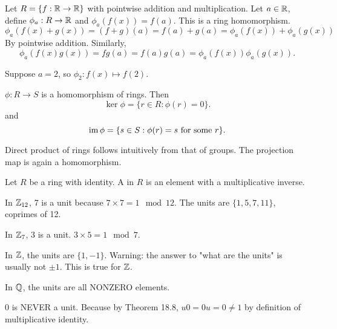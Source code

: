 \documentclass[class=article,crop=false]{standalone}
\begin{document}
\begin{eg}
	Let $ R= \{f: \mathbb{R} \to \mathbb{R}\}$ with pointwise addition and multiplication. Let $a \in \mathbb{R}$, define $ \phi_a: R \to \mathbb{R}$ and $ \phi_a(f(x))=f(a)$. This is a ring homomorphism.
	\[
		\phi_a(f(x)+g(x))= (f+g)(a) = f(a)+g(a)=\phi_a(f(x))+\phi_a(g(x))
	\] 
By pointwise addition. Similarly,
\[
	\phi_a(f(x)g(x))= fg(a)= f(a)g(a)= \phi_a(f(x)) \phi_a(g(x))
.\] 

Suppose $ a=2$, so  $ \phi_2 : f(x) \mapsto f(2)$.
\end{eg}

\begin{defn}[]
$ \phi: R \to S$ is a homomorphism of rings. Then
\[
	\ker \phi = \{ r \in R: \phi(r)=0\} 
.\] 
and
\[
	\operatorname{im} \phi= \{s \in S: \phi(r)=s \text{ for some }r \} 
.\] 
\end{defn}

\begin{note}[]
Direct product of rings follows intuitively from that of groups. The projection map is again a homomorphism.
\end{note}

\begin{defn}[unit]
Let $ R$ be a ring with identity. A  in $ R$ is an element with a multiplicative inverse. 
\end{defn}
\begin{eg}[]
In $ \mathbb{Z}_{12}$, 7 is a unit because $ 7\times 7=1 \mod 12$. The units are $ \{1,5,7,11\} $, coprimes of 12.

In $ \mathbb{Z}_7$, 3 is a unit. $ 3 \times 5= 1 \mod 7$. 

In $ \mathbb{Z}$, the units are $ \{1,-1\} $. Warning: the answer to "what are the units" is usually not $ \pm 1$. This is true for  $ \mathbb{Z}$.

In $ \mathbb{Q}$, the units are all NONZERO elements.
\end{eg}

\begin{note}[]
$ 0$ is NEVER a unit. Because  by Theorem 18.8, $ u0=0u=0 \neq 1$ by definition of multiplicative identity.
\end{note}
\end{document}
